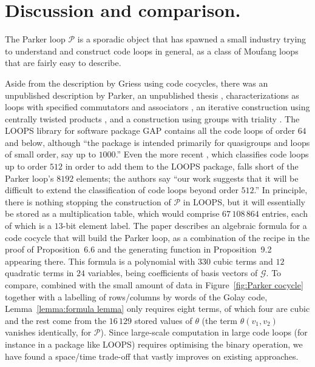 \documentclass{article}
\theoremstyle{plain}
\theoremstyle{definition}
\def \cG {\mathcal{G}}
\def \cP {\mathcal{P}}
\begin{document}
\section{Discussion and comparison.}\label{sec:discussion}

The Parker loop $\cP$ is a sporadic object that has spawned a small industry trying to understand and construct code loops in general, as a class of Moufang loops that are fairly easy to describe.

Aside from the description by Griess using code cocycles, there was an unpublished description by Parker, an unpublished thesis \cite{Johnson}, characterizations as loops with specified commutators and associators \cite{CheinGoodaire}, an iterative construction using centrally twisted products \cite{Hsu}, and a construction using groups with triality \cite{Nagy}. 
The LOOPS library \cite{LOOPS} for software package GAP \cite{GAP4} contains all the code loops of order $64$ and below, although ``the package is intended primarily for quasigroups and loops of small order, say up to $1000$.''
Even the more recent \cite{OBrien_Vojtechovsky}, which classifies code loops up to order $512$ in order to add them to the LOOPS package, falls short of the Parker loop's $8192$ elements; the authors say ``our work suggests that it will be difficult to extend the classification of code loops beyond order $512$.''
In principle, there is nothing stopping the construction of $\cP$ in LOOPS, but it will essentially be stored as a multiplication table, which would comprise $67\,108\,864$ entries, each of which is a $13$-bit element label.
The paper \cite{Morier-Genoud_Ovsienko} describes an algebraic formula for a code cocycle that will build the Parker loop, as a combination of the recipe in the proof of Proposition~6.6 and the generating function in Proposition~9.2 appearing there.
This formula is a polynomial with $330$ cubic terms and $12$ quadratic terms in $24$ variables, being coefficients of basis vectors of $\cG$. 
To compare, combined with the small amount of data in Figure~\ref{fig:Parker cocycle} together with a labelling of rows/columns by words of the Golay code, Lemma~\ref{lemma:formula lemma} only requires eight terms, of which four are cubic and the rest come from the $16\,129$ stored values of $\theta$ (the term $\theta(v_1,v_2)$ vanishes identically, for $\cP$).
Since large-scale computation in large code loops (for instance in a package like LOOPS) requires optimising the binary operation, we have found a space/time trade-off that vastly improves on existing approaches.
\end{document}
